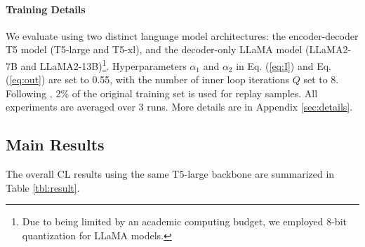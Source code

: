 \paragraph{Training Details}
We evaluate {\ouralg} using two distinct language model architectures: the encoder-decoder T5 model \cite{raffel2020exploring} (T5-large and T5-xl), and the decoder-only LLaMA model \cite{touvron2023llama} (LLaMA2-7B and LLaMA2-13B)\footnote{Due to being limited by an academic computing budget, we employed 8-bit quantization for LLaMA models.}.
Hyperparameters $\alpha_1$ and $\alpha_2$ in Eq. (\ref{eq:I}) and Eq. (\ref{eq:out}) are set to 0.55, with the number of inner loop iterations $Q$ set to 8. Following \citet{zhao2024sapt}, 2\% of the original training set is used for replay samples.
All experiments are averaged over 3 runs. 
More details are in Appendix \ref{sec:details}.




\subsection{Main Results}
The overall CL results using the same T5-large backbone are summarized in Table \ref{tbl:result}.


